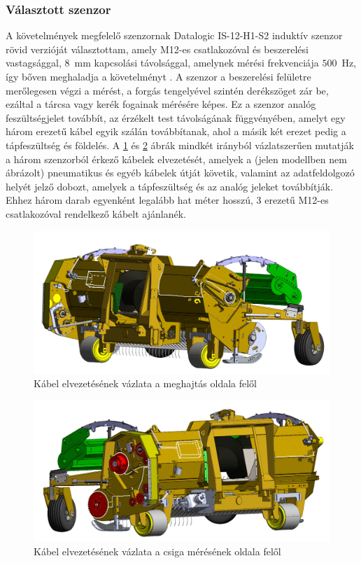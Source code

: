 \subsubsection{Választott szenzor}

A követelmények megfelelő szenzornak Datalogic IS-12-H1-S2 induktív szenzor rövid verzióját választottam, amely M12-es csatlakozóval és beszerelési vastagsággal, $8$~mm kapcsolási távolsággal, amelynek mérési frekvenciája $500$~Hz, így bőven meghaladja a követelményt \cite{datalogic_catalog}. A szenzor a beszerelési felületre merőlegesen végzi a mérést, a forgás tengelyével szintén derékszöget zár be, ezáltal a tárcsa vagy kerék fogainak mérésére képes. Ez a szenzor analóg feszültségjelet továbbít, az érzékelt test távolságának függvényében, amelyt egy három erezetű kábel egyik szálán továbbítanak, ahol a másik két erezet pedig a tápfeszültség és földelés. A \ref{kabelezes_1} és \ref{kabelezes_2} ábrák mindkét irányból vázlatszerűen mutatják a három szenzorból érkező kábelek elvezetését, amelyek a (jelen modellben nem ábrázolt) pneumatikus és egyéb kábelek útját követik, valamint az adatfeldolgozó helyét jelző dobozt, amelyek a tápfeszültség és az analóg jeleket továbbítják. Ehhez három darab egyenként legalább hat méter hosszú, 3 erezetű M12-es csatlakozóval rendelkező kábelt ajánlanék.
\begin{figure}
	\centering
	\includegraphics[width=\columnwidth*6/10]{figures/rajzolt_kabelezes_1.jpg}
	\caption{Kábel elvezetésének vázlata a meghajtás oldala felől}
	\label{kabelezes_1}
\end{figure}
\begin{figure}
	\centering
	\includegraphics[width=\columnwidth*6/10]{figures/rajzolt_kabelezes_2.jpg}
	\caption{Kábel elvezetésének vázlata a csiga mérésének oldala felől}
	\label{kabelezes_2}
\end{figure}

